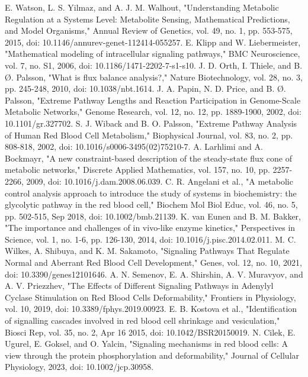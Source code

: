 \documentclass[conference]{IEEEtran}
\begin{document}
\begin{thebibliography}{00}
 E. Watson, L. S. Yilmaz, and A. J. M. Walhout, "Understanding Metabolic Regulation at a Systems Level: Metabolite Sensing, Mathematical Predictions, and Model Organisms," Annual Review of Genetics, vol. 49, no. 1, pp. 553-575, 2015, doi: 10.1146/annurev-genet-112414-055257.
 E. Klipp and W. Liebermeister, "Mathematical modeling of intracellular signaling pathways," BMC Neuroscience, vol. 7, no. S1, 2006, doi: 10.1186/1471-2202-7-s1-s10.
 J. D. Orth, I. Thiele, and B. Ø. Palsson, "What is flux balance analysis?," Nature Biotechnology, vol. 28, no. 3, pp. 245-248, 2010, doi: 10.1038/nbt.1614.
 J. A. Papin, N. D. Price, and B. Ø. Palsson, "Extreme Pathway Lengths and Reaction Participation in Genome-Scale Metabolic Networks," Genome Research, vol. 12, no. 12, pp. 1889-1900, 2002, doi: 10.1101/gr.327702.
 S. J. Wiback and B. O. Palsson, "Extreme Pathway Analysis of Human Red Blood Cell Metabolism," Biophysical Journal, vol. 83, no. 2, pp. 808-818, 2002, doi: 10.1016/s0006-3495(02)75210-7.
 A. Larhlimi and A. Bockmayr, "A new constraint-based description of the steady-state flux cone of metabolic networks," Discrete Applied Mathematics, vol. 157, no. 10, pp. 2257-2266, 2009, doi: 10.1016/j.dam.2008.06.039.
 C. R. Angelani et al., "A metabolic control analysis approach to introduce the study of systems in biochemistry: the glycolytic pathway in the red blood cell," Biochem Mol Biol Educ, vol. 46, no. 5, pp. 502-515, Sep 2018, doi: 10.1002/bmb.21139.
K. van Eunen and B. M. Bakker, "The importance and challenges of in vivo-like enzyme kinetics," Perspectives in Science, vol. 1, no. 1-6, pp. 126-130, 2014, doi: 10.1016/j.pisc.2014.02.011.
 M. C. Wilkes, A. Shibuya, and K. M. Sakamoto, "Signaling Pathways That Regulate Normal and Aberrant Red Blood Cell Development," Genes, vol. 12, no. 10, 2021, doi: 10.3390/genes12101646.
 A. N. Semenov, E. A. Shirshin, A. V. Muravyov, and A. V. Priezzhev, "The Effects of Different Signaling Pathways in Adenylyl Cyclase Stimulation on Red Blood Cells Deformability," Frontiers in Physiology, vol. 10, 2019, doi: 10.3389/fphys.2019.00923.
 E. B. Kostova et al., "Identification of signalling cascades involved in red blood cell shrinkage and vesiculation," Biosci Rep, vol. 35, no. 2, Apr 16 2015, doi: 10.1042/BSR20150019.
 N. Cilek, E. Ugurel, E. Goksel, and O. Yalcin, "Signaling mechanisms in red blood cells: A view through the protein phosphorylation and deformability," Journal of Cellular Physiology, 2023, doi: 10.1002/jcp.30958.

\end{thebibliography}
\end{document}
